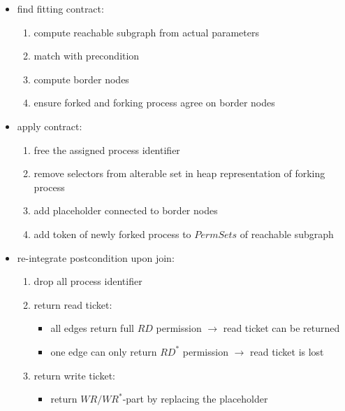 \documentclass{scrartcl}
\begin{document}
	\begin{itemize}
		\item find fitting contract:
			\begin{enumerate}
				\item compute reachable subgraph from actual parameters
				\item match with precondition
				\item compute border nodes
				\item ensure forked and forking process agree on border nodes
			\end{enumerate}
		\item apply contract:
			\begin{enumerate}
				\item free the assigned process identifier
				\item remove selectors from alterable set in heap representation of
					forking process
				\item add placeholder connected to border nodes
				\item add token of newly forked process to
					$\mathit{PermSets}$ of reachable subgraph
			\end{enumerate}
	\end{itemize}
	\newpage
	\begin{itemize}
		\item re-integrate postcondition upon join:
			\begin{enumerate}
				\item drop all process identifier
				\item return read ticket:
					\begin{itemize}
						\item all edges return full $\mathit{RD}$ permission
							$\rightarrow$ read ticket can be returned
						\item one edge can only return $\mathit{RD}^{\ast}$
							permission $\rightarrow$ read ticket is lost
					\end{itemize}
				\item return write ticket:
					\begin{itemize}
						\item return $\mathit{WR}/\mathit{WR}^{\ast}$-part by
							replacing the placeholder
					\end{itemize}
			\end{enumerate}
	\end{itemize}
\end{document}
